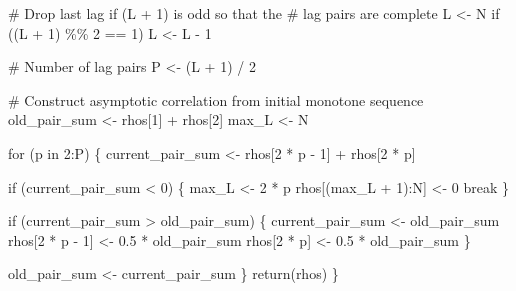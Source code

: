 \documentclass[
  letterpaper,
  DIV=11,
  numbers=noendperiod]{scrartcl}
\newenvironment{Shaded}{\begin{snugshade}}{\end{snugshade}}
\newcommand{\CommentTok}[1]{\textcolor[rgb]{0.37,0.37,0.37}{#1}}
\newcommand{\ControlFlowTok}[1]{\textcolor[rgb]{0.00,0.23,0.31}{#1}}
\newcommand{\DecValTok}[1]{\textcolor[rgb]{0.68,0.00,0.00}{#1}}
\newcommand{\FloatTok}[1]{\textcolor[rgb]{0.68,0.00,0.00}{#1}}
\newcommand{\KeywordTok}[1]{\textcolor[rgb]{0.00,0.23,0.31}{#1}}
\newcommand{\NormalTok}[1]{\textcolor[rgb]{0.00,0.23,0.31}{#1}}
\newcommand{\OperatorTok}[1]{\textcolor[rgb]{0.37,0.37,0.37}{#1}}
\begin{document}
\begin{Shaded}
\begin{Highlighting}[]
  \CommentTok{\# Drop last lag if (L + 1) is odd so that the}
  \CommentTok{\# lag pairs are complete}
\NormalTok{  L }\OperatorTok{\textless{}{-}}\NormalTok{ N}
  \ControlFlowTok{if}\NormalTok{ ((L }\OperatorTok{+} \DecValTok{1}\NormalTok{) }\OperatorTok{\%\%} \DecValTok{2} \OperatorTok{==} \DecValTok{1}\NormalTok{)}
\NormalTok{    L }\OperatorTok{\textless{}{-}}\NormalTok{ L }\OperatorTok{{-}} \DecValTok{1}

  \CommentTok{\# Number of lag pairs}
\NormalTok{  P }\OperatorTok{\textless{}{-}}\NormalTok{ (L }\OperatorTok{+} \DecValTok{1}\NormalTok{) }\OperatorTok{/} \DecValTok{2}

  \CommentTok{\# Construct asymptotic correlation from initial monotone sequence}
\NormalTok{  old\_pair\_sum }\OperatorTok{\textless{}{-}}\NormalTok{ rhos[}\DecValTok{1}\NormalTok{] }\OperatorTok{+}\NormalTok{ rhos[}\DecValTok{2}\NormalTok{]}
\NormalTok{  max\_L }\OperatorTok{\textless{}{-}}\NormalTok{ N}

  \ControlFlowTok{for}\NormalTok{ (p }\KeywordTok{in} \DecValTok{2}\NormalTok{:P) \{}
\NormalTok{    current\_pair\_sum }\OperatorTok{\textless{}{-}}\NormalTok{ rhos[}\DecValTok{2} \OperatorTok{*}\NormalTok{ p }\OperatorTok{{-}} \DecValTok{1}\NormalTok{] }\OperatorTok{+}\NormalTok{ rhos[}\DecValTok{2} \OperatorTok{*}\NormalTok{ p]}
  
    \ControlFlowTok{if}\NormalTok{ (current\_pair\_sum }\OperatorTok{\textless{}} \DecValTok{0}\NormalTok{) \{}
\NormalTok{      max\_L }\OperatorTok{\textless{}{-}} \DecValTok{2} \OperatorTok{*}\NormalTok{ p}
\NormalTok{      rhos[(max\_L }\OperatorTok{+} \DecValTok{1}\NormalTok{):N] }\OperatorTok{\textless{}{-}} \DecValTok{0}
      \ControlFlowTok{break}
\NormalTok{    \}}
  
    \ControlFlowTok{if}\NormalTok{ (current\_pair\_sum }\OperatorTok{\textgreater{}}\NormalTok{ old\_pair\_sum) \{}
\NormalTok{      current\_pair\_sum }\OperatorTok{\textless{}{-}}\NormalTok{ old\_pair\_sum}
\NormalTok{      rhos[}\DecValTok{2} \OperatorTok{*}\NormalTok{ p }\OperatorTok{{-}} \DecValTok{1}\NormalTok{] }\OperatorTok{\textless{}{-}} \FloatTok{0.5} \OperatorTok{*}\NormalTok{ old\_pair\_sum}
\NormalTok{      rhos[}\DecValTok{2} \OperatorTok{*}\NormalTok{ p] }\OperatorTok{\textless{}{-}} \FloatTok{0.5} \OperatorTok{*}\NormalTok{ old\_pair\_sum}
\NormalTok{    \}}
  
\NormalTok{    old\_pair\_sum }\OperatorTok{\textless{}{-}}\NormalTok{ current\_pair\_sum}
\NormalTok{  \}}
  \ControlFlowTok{return}\NormalTok{(rhos)}
\NormalTok{\}}
\end{Highlighting}
\end{Shaded}
\end{document}
